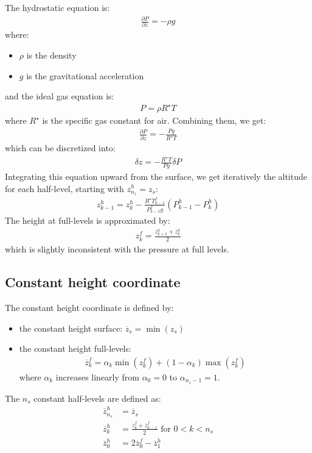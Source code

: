 \documentclass[12pt]{scrartcl}
\begin{document}
The hydrostatic equation is:
\begin{align}
\frac{\partial P}{\partial z} = -\rho g
\end{align}
where:
\begin{itemize}
\item $\rho$ is the density
\item $g$ is the gravitational acceleration
\end{itemize}
and the ideal gas equation is:
\begin{align}
P = \rho R^\star T
\end{align}
where $R^\star$ is the specific gas constant for air. Combining them, we get:
\begin{align}
\label{eq:vertical}
\frac{\partial P}{\partial z} = -\frac{Pg}{R^\star T}
\end{align}
which can be discretized into:
\begin{align}
\delta z =  -\frac{R^\star T}{Pg} \delta P
\end{align}
Integrating this equation upward from the surface, we get iteratively the altitude for each half-level, starting with $z^h_{n_z} = z_s$:
\begin{align}
z^h_{k-1} = z^h_k - \frac{R^\star T^f_{k-1}}{P^f_{k-1} g} \left(P^h_{k-1}-P^h_k\right)
\end{align}
The height at full-levels is approximated by:
\begin{align}
z^f_k = \frac{z^h_{k+1} + z^h_k}{2}
\end{align}
which is slightly inconsistent with the pressure at full levels.

\subsection{Constant height coordinate}

The constant height coordinate is defined by:
\begin{itemize}
\item the constant height surface: $\overline{z}_s = \min(z_s)$
\item the constant height full-levels:
\begin{align}
\overline{z}^f_k = \alpha_k \min(z^f_k) + (1-\alpha_k) \max(z^f_k)
\end{align}
where $\alpha_k$ increases linearly from $\alpha_0 = 0$ to $\alpha_{n_z-1} = 1$.
\end{itemize}
The $n_s$ constant half-levels are defined as:
\begin{subequations}
\begin{align}
\overline{z}^h_{n_s} & = \overline{z}_s \\
\overline{z}^h_k & = \frac{\overline{z}^f_k+\overline{z}^f_{k-1}}{2} \text{ for } 0 < k < n_s \\
\overline{z}^h_0 & = 2 \overline{z}^f_0-\overline{z}^h_{1}
\end{align}
\end{subequations}
\end{document}
